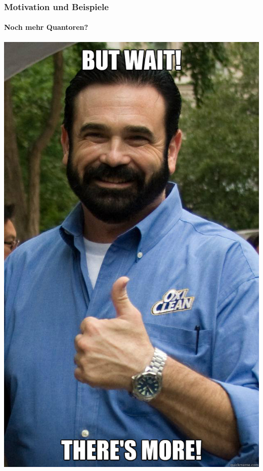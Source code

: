\begin{frame}
	\frametitle{Motivation und Beispiele}
	\framesubtitle{Noch mehr Quantoren?}
	\begin{center}
		\includegraphics[scale = 0.15]{images/more.jpg}
	\end{center}
\end{frame}